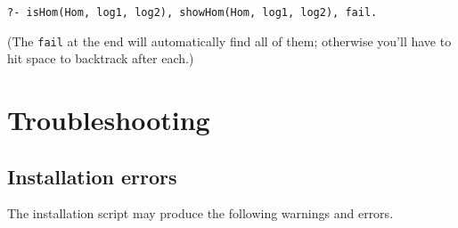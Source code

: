 \documentclass[
]{article}
\newcommand{\passthrough}[1]{#1}
\begin{document}
\begin{lstlisting}
?- isHom(Hom, log1, log2), showHom(Hom, log1, log2), fail.
\end{lstlisting}

(The \passthrough{\lstinline!fail!} at the end will automatically find
all of them; otherwise you'll have to hit space to backtrack after
each.)

\hypertarget{troubleshooting}{%
\section{Troubleshooting}\label{troubleshooting}}

\hypertarget{installation-errors}{%
\subsection{Installation errors}\label{installation-errors}}

The installation script may produce the following warnings and errors.
\end{document}
